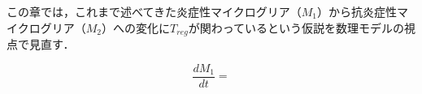 \documentclass{jsarticle}
\begin{document}
この章では，これまで述べてきた炎症性マイクログリア（$M_1$）から抗炎症性マイクログリア（$M_2$）への変化に$T_{reg}$が関わっているという仮説を数理モデルの視点で見直す．


\[ 
\frac{dM_1}{dt}=  
\]
\end{document}
